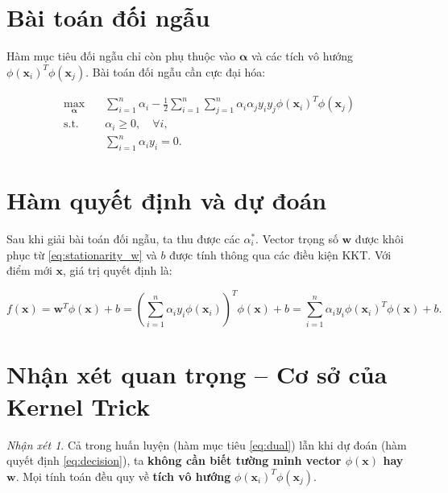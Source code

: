 \documentclass[12pt,a4paper]{article}
\theoremstyle{definition}
\theoremstyle{remark}
\newtheorem*{remark}{Nhận xét}
\begin{document}
\section{Bài toán đối ngẫu}

Hàm mục tiêu đối ngẫu chỉ còn phụ thuộc vào $\bm{\alpha}$ và các tích vô hướng $\phi(\mathbf{x}_i)^T \phi(\mathbf{x}_j)$. Bài toán đối ngẫu cần cực đại hóa:

\begin{equation}\label{eq:dual}
\boxed{
\begin{aligned}
\max_{\bm{\alpha}} \quad & \sum_{i=1}^n \alpha_i - \frac{1}{2} \sum_{i=1}^n \sum_{j=1}^n \alpha_i \alpha_j y_i y_j \phi(\mathbf{x}_i)^T \phi(\mathbf{x}_j) \\
\text{s.t.} \quad & \alpha_i \ge 0, \quad \forall i, \\
& \sum_{i=1}^n \alpha_i y_i = 0.
\end{aligned}
}
\end{equation}

\section{Hàm quyết định và dự đoán}

Sau khi giải bài toán đối ngẫu, ta thu được các $\alpha_i^*$. Vector trọng số $\mathbf{w}$ được khôi phục từ \eqref{eq:stationarity_w} và $b$ được tính thông qua các điều kiện KKT. Với điểm mới $\mathbf{x}$, giá trị quyết định là:

\begin{equation}\label{eq:decision}
f(\mathbf{x}) = \mathbf{w}^T \phi(\mathbf{x}) + b = \left( \sum_{i=1}^n \alpha_i y_i \phi(\mathbf{x}_i) \right)^T \phi(\mathbf{x}) + b = \sum_{i=1}^n \alpha_i y_i \phi(\mathbf{x}_i)^T \phi(\mathbf{x}) + b.
\end{equation}

\section{Nhận xét quan trọng – Cơ sở của Kernel Trick}

\begin{remark}
Cả trong huấn luyện (hàm mục tiêu \eqref{eq:dual}) lẫn khi dự đoán (hàm quyết định \eqref{eq:decision}), ta \textbf{không cần biết tường minh vector $\phi(\mathbf{x})$ hay $\mathbf{w}$}. Mọi tính toán đều quy về \textbf{tích vô hướng} $\phi(\mathbf{x}_i)^T \phi(\mathbf{x}_j)$.
\end{remark}
\end{document}

